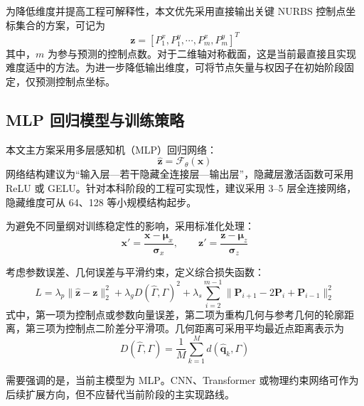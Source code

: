 \documentclass{FRB-style}
\begin{document}
为降低维度并提高工程可解释性，本文优先采用直接输出关键 NURBS 控制点坐标集合的方案，可记为
\begin{equation}
\mathbf{z}=
[P_1^x,P_1^y,\cdots,P_m^x,P_m^y]^T
\end{equation}
其中，$m$ 为参与预测的控制点数。对于二维轴对称截面，这是当前最直接且实现难度适中的方法。为进一步降低输出维度，可将节点矢量与权因子在初始阶段固定，仅预测控制点坐标。

\subsection{MLP 回归模型与训练策略}

本文主方案采用多层感知机（MLP）回归网络：
\begin{equation}
\hat{\mathbf{z}}=\mathcal{F}_{\theta}(\mathbf{x})
\end{equation}
网络结构建议为“输入层—若干隐藏全连接层—输出层”，隐藏层激活函数可采用 ReLU 或 GELU。针对本科阶段的工程可实现性，建议采用 3--5 层全连接网络，隐藏维度可从 64、128 等小规模结构起步。

为避免不同量纲对训练稳定性的影响，采用标准化处理：
\begin{equation}
\mathbf{x}'=\frac{\mathbf{x}-\boldsymbol{\mu}_x}{\boldsymbol{\sigma}_x},
\qquad
\mathbf{z}'=\frac{\mathbf{z}-\boldsymbol{\mu}_z}{\boldsymbol{\sigma}_z}
\end{equation}

考虑参数误差、几何误差与平滑约束，定义综合损失函数：
\begin{equation}
L=
\lambda_p \|\hat{\mathbf{z}}-\mathbf{z}\|_2^2
+
\lambda_g D(\hat{\Gamma},\Gamma)^2
+
\lambda_s \sum_{i=2}^{m-1}
\|\mathbf{P}_{i+1}-2\mathbf{P}_i+\mathbf{P}_{i-1}\|_2^2
\end{equation}
式中，第一项为控制点或参数向量误差，第二项为重构几何与参考几何的轮廓距离，第三项为控制点二阶差分平滑项。几何距离可采用平均最近点距离表示为
\begin{equation}
D(\hat{\Gamma},\Gamma)
=
\frac{1}{M}
\sum_{k=1}^{M}
d(\hat{\mathbf{q}}_k,\Gamma)
\end{equation}

需要强调的是，当前主模型为 MLP。CNN、Transformer 或物理约束网络可作为后续扩展方向，但不应替代当前阶段的主实现路线。
\end{document}
